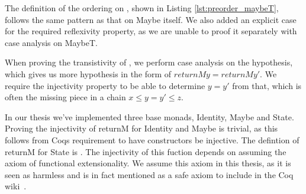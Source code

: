 The definition of the ordering on , shown in Listing
\ref{lst:preorder_maybeT}, follows the same pattern as that on Maybe itself. We
also added an explicit case for the required reflexivity property, as we are
unable to proof it separately with case analysis on MaybeT.

When proving the transistivity of , we perform case analysis on
the hypothesis, which gives us more hypothesis in the form of $returnM y =
returnM y'$. We require the injectivity property to be able to determine 
$y = y'$
from that, which is often the missing piece in a chain $x \le y = y' \le z$.

In our thesis we've implemented three base monads, Identity, Maybe and State.
Proving the injectivity of returnM for Identity and Maybe is trivial, as this
follows from Coqs requirement to have constructors be injective. The defintion
of returnM for State is . The injectivity of
this fuction depends on assuming the axiom of functional extensionality.
We assume this axiom in this thesis, as it is seen as harmless and is in fact
mentioned as a safe axiom to include in the Coq
wiki~\cite{coqwiki_extensionality}.

